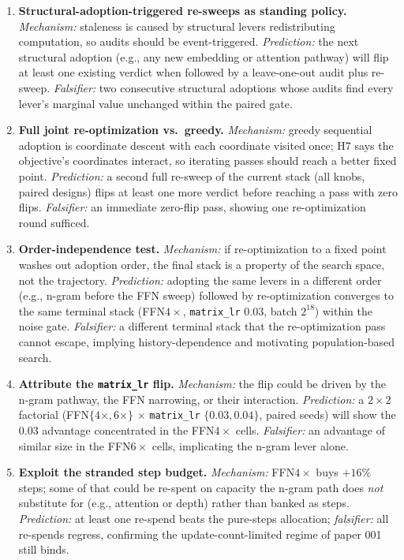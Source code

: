 \documentclass{article}
\begin{document}
\begin{enumerate}
    \item \textbf{Structural-adoption-triggered re-sweeps as standing policy.} \emph{Mechanism:} staleness is caused by structural levers redistributing computation, so audits should be event-triggered. \emph{Prediction:} the next structural adoption (e.g., any new embedding or attention pathway) will flip at least one existing verdict when followed by a leave-one-out audit plus re-sweep. \emph{Falsifier:} two consecutive structural adoptions whose audits find every lever's marginal value unchanged within the paired gate.
    \item \textbf{Full joint re-optimization vs.\ greedy.} \emph{Mechanism:} greedy sequential adoption is coordinate descent with each coordinate visited once; H7 says the objective's coordinates interact, so iterating passes should reach a better fixed point. \emph{Prediction:} a second full re-sweep of the current stack (all knobs, paired designs) flips at least one more verdict before reaching a pass with zero flips. \emph{Falsifier:} an immediate zero-flip pass, showing one re-optimization round sufficed.
    \item \textbf{Order-independence test.} \emph{Mechanism:} if re-optimization to a fixed point washes out adoption order, the final stack is a property of the search space, not the trajectory. \emph{Prediction:} adopting the same levers in a different order (e.g., n-gram before the FFN sweep) followed by re-optimization converges to the same terminal stack (FFN$4\times$, \texttt{matrix\_lr} $0.03$, batch $2^{18}$) within the noise gate. \emph{Falsifier:} a different terminal stack that the re-optimization pass cannot escape, implying history-dependence and motivating population-based search.
    \item \textbf{Attribute the \texttt{matrix\_lr} flip.} \emph{Mechanism:} the flip could be driven by the n-gram pathway, the FFN narrowing, or their interaction. \emph{Prediction:} a $2\times2$ factorial (FFN$\{4\times, 6\times\}$ $\times$ \texttt{matrix\_lr} $\{0.03, 0.04\}$, paired seeds) will show the $0.03$ advantage concentrated in the FFN$4\times$ cells. \emph{Falsifier:} an advantage of similar size in the FFN$6\times$ cells, implicating the n-gram lever alone.
    \item \textbf{Exploit the stranded step budget.} \emph{Mechanism:} FFN$4\times$ buys $+16\%$ steps; some of that could be re-spent on capacity the n-gram path does \emph{not} substitute for (e.g., attention or depth) rather than banked as steps. \emph{Prediction:} at least one re-spend beats the pure-steps allocation; \emph{falsifier:} all re-spends regress, confirming the update-count-limited regime of paper 001 still binds.
\end{enumerate}
\end{document}
